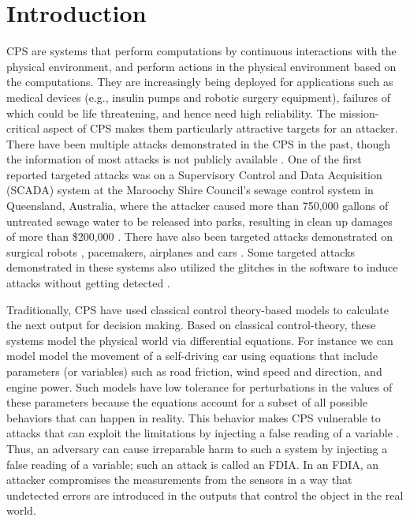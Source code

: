 
\chapter{Introduction }
\label{ch:Chapter1}
\ac{CPS} are systems that perform computations by continuous interactions with the physical environment, and perform actions in the physical environment based on the computations.   
They are increasingly being deployed for applications \cite{10.1145/2038642.2038685}\cite{10.1145/1837274.1837463} \cite{6051465} such as medical devices (e.g., insulin pumps and robotic surgery equipment), failures of which could be life threatening, and hence need high reliability. 
The mission-critical aspect of \ac{CPS} makes them particularly attractive targets for an attacker. 
There have been multiple attacks demonstrated in the \ac{CPS} in the past, though the information of most attacks is not publicly available \cite{doi:10.1080/13518040590969785}.
One of the first reported targeted attacks was on a Supervisory Control and Data Acquisition (SCADA) system \cite{article22} at the Maroochy Shire Council’s sewage control system in Queensland, Australia, where the attacker caused more than 750,000 gallons of untreated sewage water to be released into parks, resulting in clean up damages of more than \$200,000 \cite{10.1016/j.adhoc.2009.04.012}.
There have also been targeted attacks demonstrated on surgical robots \cite{7579758}, pacemakers\cite{4531149}, airplanes \cite{217595} and  cars \cite{10.5555/1929820.1929848}.
Some targeted attacks demonstrated in these systems also utilized the glitches in the software to induce attacks without getting detected \cite{242054}. 



Traditionally, \ac{CPS} have used classical control theory-based models  \cite{1337806} \cite{10.1145/2038642.2038667} \cite{6051465} to calculate the next output for decision making. 
Based on classical control-theory, these systems model the physical world via differential equations. 
For instance we can model model the movement of a self-driving car using equations that include parameters (or variables) such as road friction, wind speed and direction, and engine power. 
Such models have low tolerance for perturbations in the values of these parameters because the equations account for a subset of all possible behaviors that can happen in reality. 
This behavior makes \ac{CPS} vulnerable to attacks that can exploit the limitations by injecting a false reading of a variable \cite{10.1145/1952982.1952995}. 
Thus, an adversary can cause irreparable harm to such a system by injecting a false reading of a variable; such an attack is called an \ac{FDIA}.
 In an \ac{FDIA}, an attacker compromises the measurements from the sensors in a way that undetected errors are introduced in the outputs \cite{7438916} that control the object in the real world. 
 


